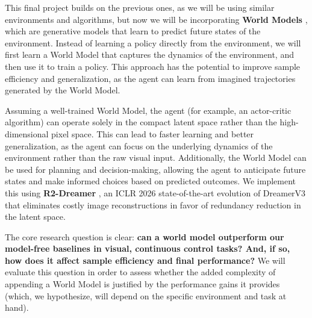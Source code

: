 \documentclass{article}
\begin{document}
This final project builds on the previous ones, as we will be using similar environments and algorithms, but now we will be incorporating \textbf{World Models} \cite{ha2018world}, which are generative models that learn to predict future states of the environment. Instead of learning a policy directly from the environment, we will first learn a World Model that captures the dynamics of the environment, and then use it to train a policy. This approach has the potential to improve sample efficiency and generalization, as the agent can learn from imagined trajectories generated by the World Model.

Assuming a well-trained World Model, the agent (for example, an actor-critic algorithm) can operate solely in the compact latent space rather than the high-dimensional pixel space. This can lead to faster learning and better generalization, as the agent can focus on the underlying dynamics of the environment rather than the raw visual input. Additionally, the World Model can be used for planning and decision-making, allowing the agent to anticipate future states and make informed choices based on predicted outcomes.
\newpage
We implement this using \textbf{R2-Dreamer} \cite{morihira2026r2dreamer}, an ICLR 2026 state-of-the-art evolution of DreamerV3 \cite{hafner2023mastering} that eliminates costly image reconstructions in favor of redundancy reduction in the latent space.

The core research question is clear: \textbf{can a world model outperform our model-free baselines in visual, continuous control tasks? And, if so, how does it affect sample efficiency and final performance?} We will evaluate this question in order to assess whether the added complexity of appending a World Model is justified by the performance gains it provides (which, we hypothesize, will depend on the specific environment and task at hand).

\end{document}
